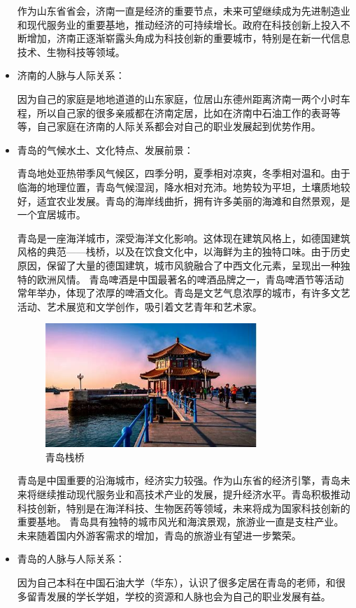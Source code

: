 \documentclass{article}
\begin{document}
\begin{itemize}
作为山东省省会，济南一直是经济的重要节点，未来可望继续成为先进制造业和现代服务业的重要基地，推动经济的可持续增长。政府在科技创新上投入不断增加，济南正逐渐崭露头角成为科技创新的重要城市，特别是在新一代信息技术、生物科技等领域。

\item 济南的人脉与人际关系：
\par 因为自己的家庭是地地道道的山东家庭，位居山东德州距离济南一两个小时车程，所以自己家的很多亲戚都在济南定居，比如在济南中石油工作的表哥等等，自己家庭在济南的人际关系都会对自己的职业发展起到优势作用。

\item 青岛的气候水土、文化特点、发展前景：\par
\par 青岛地处亚热带季风气候区，四季分明，夏季相对凉爽，冬季相对温和。由于临海的地理位置，青岛气候湿润，降水相对充沛。地势较为平坦，土壤质地较好，适宜农业发展。青岛的海岸线曲折，拥有许多美丽的海滩和自然景观，是一个宜居城市。

\par 青岛是一座海洋城市，深受海洋文化影响。这体现在建筑风格上，如德国建筑风格的典范——栈桥，以及在饮食文化中，以海鲜为主的独特口味。由于历史原因，保留了大量的德国建筑，城市风貌融合了中西文化元素，呈现出一种独特的欧洲风情。 青岛啤酒是中国最著名的啤酒品牌之一，青岛啤酒节等活动常年举办，体现了浓厚的啤酒文化。青岛是文艺气息浓厚的城市，有许多文艺活动、艺术展览和文学创作，吸引着文艺青年和艺术家。
\begin{figure}[h!]
	\centering
	\includegraphics[width=8cm]{zhanqiao}
	\caption{青岛栈桥}
	\label{fig:zhanqiao}
\end{figure}

青岛是中国重要的沿海城市，经济实力较强。作为山东省的经济引擎，青岛未来将继续推动现代服务业和高技术产业的发展，提升经济水平。青岛积极推动科技创新，特别是在海洋科技、生物医药等领域，未来将成为国家科技创新的重要基地。 青岛具有独特的城市风光和海滨景观，旅游业一直是支柱产业。未来随着国内外游客需求的增加，青岛的旅游业有望进一步繁荣。

\item 青岛的人脉与人际关系：
\par 因为自己本科在中国石油大学（华东），认识了很多定居在青岛的老师，和很多留青发展的学长学姐，学校的资源和人脉也会为自己的职业发展有益。
\end{itemize}
\end{document}
